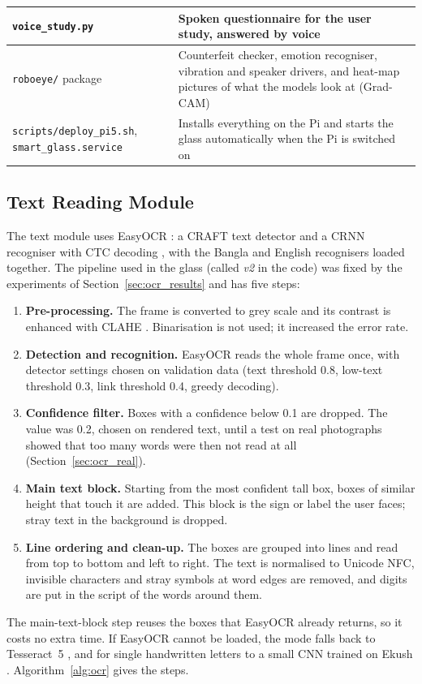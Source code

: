 \begin{table}[!htbp]
\begin{tabular}{|L{5.6cm}|L{9.0cm}|}
\texttt{voice\_study.py} & Spoken questionnaire for the user study, answered by voice \\ \hline
\texttt{roboeye/} package & Counterfeit checker, emotion recogniser, vibration and speaker drivers, and heat-map pictures of what the models look at (Grad-CAM) \\ \hline
\texttt{scripts/deploy\_pi5.sh}, \texttt{smart\_glass.service} & Installs everything on the Pi and starts the glass automatically when the Pi is switched on \\ \hline
\end{tabular}
\end{table}

\subsection{Text Reading Module}
\label{sec:ocr_method}
The text module uses EasyOCR \cite{easyocr}: a CRAFT text detector \cite{craft} and a CRNN recogniser with CTC decoding \cite{crnn, ctc}, with the Bangla and English recognisers loaded together. The pipeline used in the glass (called \textit{v2} in the code) was fixed by the experiments of Section~\ref{sec:ocr_results} and has five steps:
\begin{enumerate}[noitemsep]
    \item \textbf{Pre-processing.} The frame is converted to grey scale and its contrast is enhanced with CLAHE \cite{clahe}. Binarisation is not used; it increased the error rate.
    \item \textbf{Detection and recognition.} EasyOCR reads the whole frame once, with detector settings chosen on validation data (text threshold 0.8, low-text threshold 0.3, link threshold 0.4, greedy decoding).
    \item \textbf{Confidence filter.} Boxes with a confidence below 0.1 are dropped. The value was 0.2, chosen on rendered text, until a test on real photographs showed that too many words were then not read at all (Section~\ref{sec:ocr_real}).
    \item \textbf{Main text block.} Starting from the most confident tall box, boxes of similar height that touch it are added. This block is the sign or label the user faces; stray text in the background is dropped.
    \item \textbf{Line ordering and clean-up.} The boxes are grouped into lines and read from top to bottom and left to right. The text is normalised to Unicode NFC, invisible characters and stray symbols at word edges are removed, and digits are put in the script of the words around them.
\end{enumerate}
The main-text-block step reuses the boxes that EasyOCR already returns, so it costs no extra time. If EasyOCR cannot be loaded, the mode falls back to Tesseract~5 \cite{tesseract}, and for single handwritten letters to a small CNN trained on Ekush \cite{ekush}. Algorithm~\ref{alg:ocr} gives the steps.


